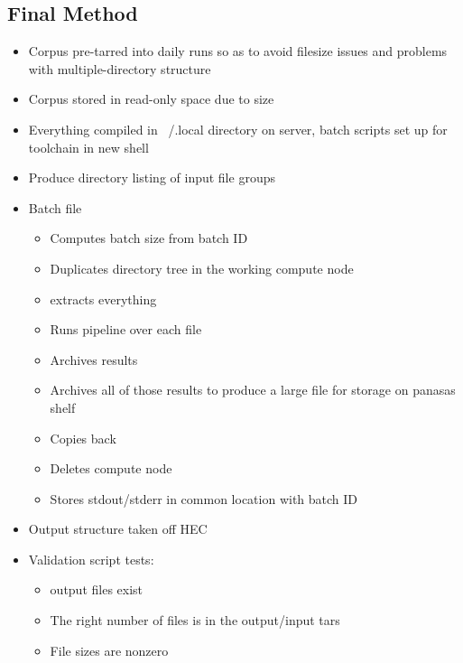 \subsection{Final Method}
\begin{itemize}
    \item Corpus pre-tarred into daily runs so as to avoid filesize issues and problems with multiple-directory structure
    \item Corpus stored in read-only space due to size
    \item Everything compiled in ~/.local directory on server, batch scripts set up for toolchain in new shell
    \item Produce directory listing of input file groups
    \item Batch file
        \begin{itemize}
            \item Computes batch size from batch ID
            \item Duplicates directory tree in the working compute node
            \item extracts everything
            \item Runs pipeline over each file
            \item Archives results 
            \item Archives all of those results to produce a large file for storage on panasas shelf
            \item Copies back
            \item Deletes compute node
            \item Stores stdout/stderr in common location with batch ID
        \end{itemize}
    \item Output structure taken off HEC
    \item Validation script tests:
        \begin{itemize}
            \item output files exist
            \item The right number of files is in the output/input tars
            \item File sizes are nonzero
        \end{itemize}
\end{itemize}



